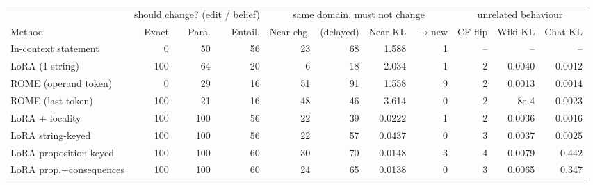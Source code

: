 \begin{tabular}{lrrrrrrrrrr}
\toprule
 & \multicolumn{3}{c}{should change? (edit / belief)} & \multicolumn{4}{c}{same domain, must not change} & \multicolumn{3}{c}{unrelated behaviour} \\
\cmidrule(lr){2-4}\cmidrule(lr){5-8}\cmidrule(lr){9-11}
Method & Exact & Para. & Entail. & Near chg. & (delayed) & Near KL & $\to$new & CF flip & Wiki KL & Chat KL \\
\midrule
In-context statement & 0 & 50 & 56 & 23 & 68 & 1.588 & 1 & -- & -- & -- \\
\addlinespace[2pt]
LoRA (1 string) & 100 & 64 & 20 & 6 & 18 & 2.034 & 1 & 2 & 0.0040 & 0.0012 \\
ROME (operand token) & 0 & 29 & 16 & 51 & 91 & 1.558 & 9 & 2 & 0.0013 & 0.0014 \\
ROME (last token) & 100 & 21 & 16 & 48 & 46 & 3.614 & 0 & 2 & 8e-4 & 0.0023 \\
\addlinespace[2pt]
LoRA + locality & 100 & 100 & 56 & 22 & 39 & 0.0222 & 1 & 2 & 0.0036 & 0.0016 \\
\addlinespace[2pt]
LoRA string-keyed & 100 & 100 & 56 & 22 & 57 & 0.0437 & 0 & 3 & 0.0037 & 0.0025 \\
\addlinespace[2pt]
LoRA proposition-keyed & 100 & 100 & 60 & 30 & 70 & 0.0148 & 3 & 4 & 0.0079 & 0.442 \\
\addlinespace[2pt]
LoRA prop.+consequences & 100 & 100 & 60 & 24 & 65 & 0.0138 & 0 & 3 & 0.0065 & 0.347 \\
\bottomrule
\end{tabular}
